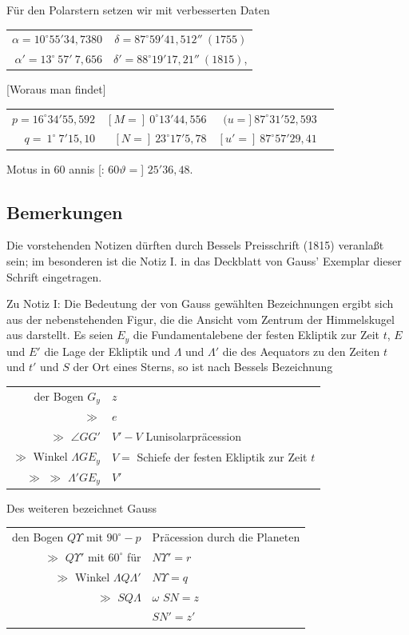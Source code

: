 \documentclass[12pt,a4paper]{article}
\theoremstyle{plain}
\theoremstyle{definition}
\theoremstyle{remark}
\begin{document}
F\"ur den Polarstern setzen wir mit verbesserten Daten
\begin{center}
\begin{tabular}{r@{\quad}r}
$\alpha = 10^{\circ}55'34{,}7380$ & $\delta = 87^{\circ}59'41{,}512''\ (1755)$ \\
$\alpha' = 13^{\circ}\ 57'\ 7{,}656$ & $\delta' = 88^{\circ}19'17{,}21''\ (1815)$,
\end{tabular}
\end{center}
[Woraus man findet]
\begin{center}
\begin{tabular}{r@{\quad}r@{\quad}r@{\quad}r}
$p = 16^{\circ}34'55{,}592$ & $[M =]\ 0^{\circ}13'44{,}556$ & $(u =]\ 87^{\circ}31'52{,}593$ \\
$q =\ 1^{\circ}\ 7'15{,}10$ & $[N =]\ 23^{\circ}17'5{,}78$ & $[u' =]\ 87^{\circ}57'29{,}41$
\end{tabular}
\end{center}
Motus in 60 annis [: $60\vartheta =$] $25'36{,}48$.

\subsection*{Bemerkungen}

Die vorstehenden Notizen d\"urften durch Bessels Preisschrift (1815) veranla\ss t sein; im besonderen ist die Notiz I. in das Deckblatt von Gauss' Exemplar dieser Schrift eingetragen.

Zu Notiz I: Die Bedeutung der von Gauss gew\"ahlten Bezeichnungen ergibt sich aus der nebenstehenden Figur, die die Ansicht vom Zentrum der Himmelskugel aus darstellt. Es seien $E_y$ die Fundamentalebene der festen Ekliptik zur Zeit $t$, $E$ und $E'$ die Lage der Ekliptik und $\Lambda$ und $\Lambda'$ die des Aequators zu den Zeiten $t$ und $t'$ und $S$ der Ort eines Sterns, so ist nach Bessels Bezeichnung
\begin{center}
\begin{tabular}{r@{\ $=$\ }l}
der Bogen $G_y$ & $z$ \\
$\gg$ & $e$ \\
$\gg$ $\angle GG'$ & $V' - V$ Lunisolarpr\"acession \\
$\gg$ Winkel $\Lambda GE_y$ & $V =$ Schiefe der festen Ekliptik zur Zeit $t$ \\
$\gg$ $\gg$ $\Lambda'GE_y$ & $V'$
\end{tabular}
\end{center}

Des weiteren bezeichnet Gauss
\begin{center}
\begin{tabular}{r@{\ $=$\ }l}
den Bogen $Q\Upsilon$ mit $90^{\circ} - p$ & Pr\"acession durch die Planeten \\
$\gg$ $Q\Upsilon'$ mit $60^{\circ}$ f\"ur & $N\Upsilon' = r$ \\
$\gg$ Winkel $\Lambda Q\Lambda'$ & $N\Upsilon = q$ \\
$\gg$ $S\!Q\Lambda$ & $\omega$ \quad $SN = z$ \\
& $SN' = z'$
\end{tabular}
\end{center}
\end{document}
